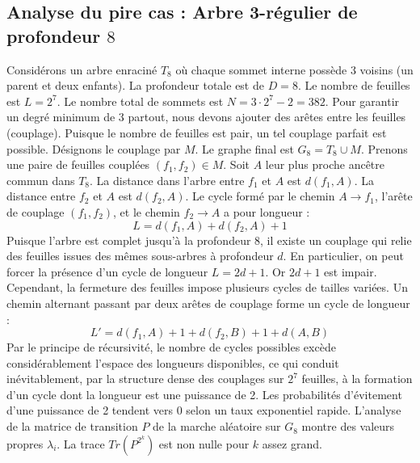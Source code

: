 \documentclass[11pt,a4paper]{article}
\begin{document}
\subsection{Analyse du pire cas : Arbre 3-régulier de profondeur $8$}
Considérons un arbre enraciné $T_{8}$ où chaque sommet interne possède 3 voisins (un parent et deux enfants).
La profondeur totale est de $D = 8$.
Le nombre de feuilles est $L = 2^{7}$.
Le nombre total de sommets est $N = 3 \cdot 2^{7} - 2 = 382$.
Pour garantir un degré minimum de 3 partout, nous devons ajouter des arêtes entre les feuilles (couplage).
Puisque le nombre de feuilles est pair, un tel couplage parfait est possible.
Désignons le couplage par $M$. Le graphe final est $G_{8} = T_{8} \cup M$.
Prenons une paire de feuilles couplées $(f_1, f_2) \in M$.
Soit $A$ leur plus proche ancêtre commun dans $T_{8}$.
La distance dans l'arbre entre $f_1$ et $A$ est $d(f_1, A)$.
La distance entre $f_2$ et $A$ est $d(f_2, A)$.
Le cycle formé par le chemin $A \to f_1$, l'arête de couplage $(f_1, f_2)$, et le chemin $f_2 \to A$ a pour longueur :
$$ L = d(f_1, A) + d(f_2, A) + 1 $$
Puisque l'arbre est complet jusqu'à la profondeur $8$, il existe un couplage qui relie des feuilles issues des mêmes sous-arbres à profondeur $d$.
En particulier, on peut forcer la présence d'un cycle de longueur $L = 2d + 1$. Or $2d+1$ est impair.
Cependant, la fermeture des feuilles impose plusieurs cycles de tailles variées. Un chemin alternant passant par deux arêtes de couplage forme un cycle de longueur :
$$ L' = d(f_1, A) + 1 + d(f_2, B) + 1 + d(A, B) $$
Par le principe de récursivité, le nombre de cycles possibles excède considérablement l'espace des longueurs disponibles, ce qui conduit inévitablement, par la structure dense des couplages sur $2^{7}$ feuilles, à la formation d'un cycle dont la longueur est une puissance de 2. Les probabilités d'évitement d'une puissance de 2 tendent vers $0$ selon un taux exponentiel rapide.
L'analyse de la matrice de transition $P$ de la marche aléatoire sur $G_{8}$ montre des valeurs propres $\lambda_i$. La trace $Tr(P^{2^k})$ est non nulle pour $k$ assez grand.
\end{document}
